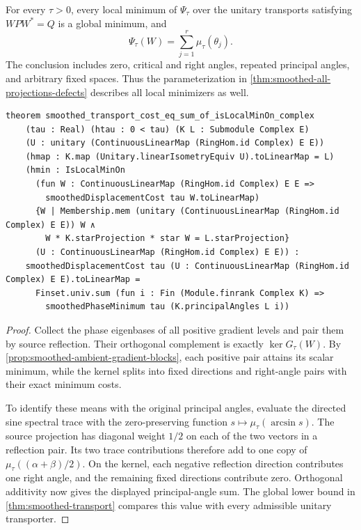 \begin{theorem}
\label{thm:smoothed-local-global}
For every $\tau>0$, every local minimum of $\Psi_\tau$ over the unitary
transports satisfying $WPW^*=Q$ is a global minimum, and
\[
 \Psi_\tau(W)=\sum_{j=1}^r\mu_\tau(\theta_j).
\]
The conclusion includes zero, critical and right angles, repeated
principal angles, and arbitrary fixed spaces. Thus the parameterization
in \cref{thm:smoothed-all-projections-defects} describes all local
minimizers as well.
\end{theorem}

\begin{lstlisting}[style=leanpaper,
 caption={Lean signature for the exact value at every constrained local
 minimum. The surrounding finite-dimensional complex Hilbert-space context
 is omitted. The feasible set contains all ambient unitary transports.},
 label={lst:smoothed-local-global}]
theorem smoothed_transport_cost_eq_sum_of_isLocalMinOn_complex
    (tau : Real) (htau : 0 < tau) (K L : Submodule Complex E)
    (U : unitary (ContinuousLinearMap (RingHom.id Complex) E E))
    (hmap : K.map (Unitary.linearIsometryEquiv U).toLinearMap = L)
    (hmin : IsLocalMinOn
      (fun W : ContinuousLinearMap (RingHom.id Complex) E E =>
        smoothedDisplacementCost tau W.toLinearMap)
      {W | Membership.mem (unitary (ContinuousLinearMap (RingHom.id Complex) E E)) W ∧
        W * K.starProjection * star W = L.starProjection}
      (U : ContinuousLinearMap (RingHom.id Complex) E E)) :
    smoothedDisplacementCost tau (U : ContinuousLinearMap (RingHom.id Complex) E E).toLinearMap =
      Finset.univ.sum (fun i : Fin (Module.finrank Complex K) =>
        smoothedPhaseMinimum tau (K.principalAngles L i))
\end{lstlisting}

\begin{proof}
Collect the phase eigenbases of all positive gradient levels and pair
them by source reflection. Their orthogonal complement is exactly
$\ker G_\tau(W)$. By \cref{prop:smoothed-ambient-gradient-blocks}, each
positive pair attains its scalar minimum, while the kernel splits into
fixed directions and right-angle pairs with their exact minimum costs.

To identify these means with the original principal angles, evaluate
the directed sine spectral trace with the zero-preserving function
$s\mapsto\mu_\tau(\arcsin s)$. The source projection has diagonal
weight $1/2$ on each of the two vectors in a reflection pair. Its two
trace contributions therefore add to one copy of
$\mu_\tau((\alpha+\beta)/2)$. On the kernel, each negative reflection
direction contributes one right angle, and the remaining fixed directions
contribute zero. Orthogonal additivity now gives the displayed
principal-angle sum. The global lower bound in
\cref{thm:smoothed-transport} compares this value with every admissible
unitary transporter.
\end{proof}

